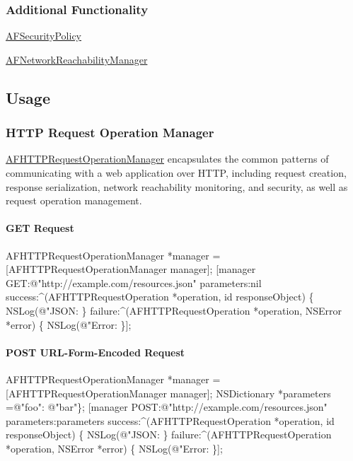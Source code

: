 \subsubsection*{Additional Functionality}


\begin{DoxyItemize}
\item {\ttfamily \mbox{\hyperlink{interface_a_f_security_policy}{A\+F\+Security\+Policy}}}
\item {\ttfamily \mbox{\hyperlink{interface_a_f_network_reachability_manager}{A\+F\+Network\+Reachability\+Manager}}}
\end{DoxyItemize}

\subsection*{Usage}

\subsubsection*{H\+T\+TP Request Operation Manager}

{\ttfamily \mbox{\hyperlink{interface_a_f_h_t_t_p_request_operation_manager}{A\+F\+H\+T\+T\+P\+Request\+Operation\+Manager}}} encapsulates the common patterns of communicating with a web application over H\+T\+TP, including request creation, response serialization, network reachability monitoring, and security, as well as request operation management.

\paragraph*{{\ttfamily G\+ET} Request}


\begin{DoxyCode}
AFHTTPRequestOperationManager *manager = [AFHTTPRequestOperationManager manager];
[manager GET:@"http://example.com/resources.json" parameters:nil success:^(AFHTTPRequestOperation
       *operation, id responseObject) \{
    NSLog(@"JSON: %
\} failure:^(AFHTTPRequestOperation *operation, NSError *error) \{
    NSLog(@"Error: %
\}];
\end{DoxyCode}


\paragraph*{{\ttfamily P\+O\+ST} U\+R\+L-\/\+Form-\/\+Encoded Request}


\begin{DoxyCode}
AFHTTPRequestOperationManager *manager = [AFHTTPRequestOperationManager manager];
NSDictionary *parameters =@"foo": @"bar"\};
[manager POST:@"http://example.com/resources.json" parameters:parameters success:^(AFHTTPRequestOperation
       *operation, id responseObject) \{
    NSLog(@"JSON: %
\} failure:^(AFHTTPRequestOperation *operation, NSError *error) \{
    NSLog(@"Error: %
\}];
\end{DoxyCode}


